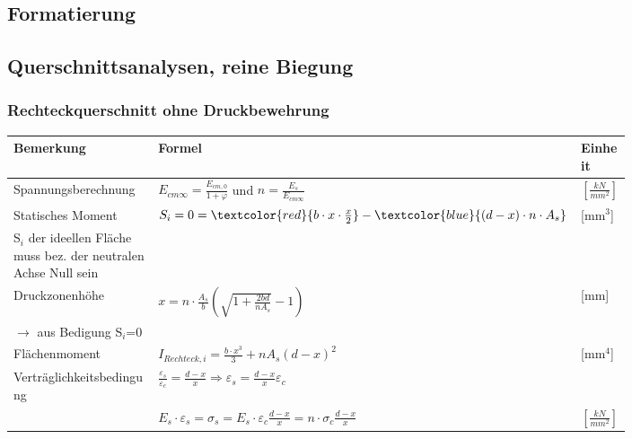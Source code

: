 

\begin{landscape}
	
	\begin{multicols}{3}

\section{Formatierung}
	
	
	
	
	\subsection{Querschnittsanalysen, reine Biegung}
	
	\subsubsection{Rechteckquerschnitt ohne Druckbewehrung}
	
	
	\begin{tabular}{p{0.4\linewidth}|p{0.4\linewidth}|l}
		
		Bemerkung		& Formel		& Einheit \\ \hline
		
		
		\hspace*{0pt} Spannungsberechnung	& $ E_{cm\infty} = \frac{E_{cm,0}}{1 + \varphi} $ und $ n = \frac{E_s}{E_{cm\infty}} $	& $ \left[ \frac{kN}{mm^2}\right] $ \\
		
		Statisches Moment	& $ S_i = 0 = 
		\textcolor{red}{ b \cdot x \cdot \frac{x}{2} } - 
		\textcolor{blue}{ (d - x) \cdot n \cdot A_s } $ & [mm$^3$] \\
		S$_i$ der ideellen Fläche muss bez. der neutralen Achse Null sein &	& \\
		
		Druckzonenhöhe		& $ x = n \cdot \frac{A_s}{b} \left( \sqrt{1 + \frac{2 b d}{n A_s}} - 1 \right) $ & [mm] \\
		$ \rightarrow $ aus Bedigung S$_i$=0 & & \\
		
		Flächenmoment		& $ I_{Rechteck,i} = \frac{b \cdot x^3}{3} + n A_s (d - x)^2 $	& [mm$^4$] \\
		
		\hspace*{0pt} Verträglichkeitsbedingung & $ \frac{\varepsilon_s}{\varepsilon_c} = \frac{d - x}{x}
		\Rightarrow \varepsilon_s = \frac{d - x}{x} \varepsilon_c $	& \\
		& $ E_s \cdot \varepsilon_s = \sigma_s = E_s \cdot \varepsilon_c \frac{d - x}{x} = n \cdot \sigma_c \frac{d - x}{x} $	& $ \left[ \frac{kN}{mm^2}\right] $ 	\\
		

\end{tabular}
\end{multicols}
\end{landscape}
